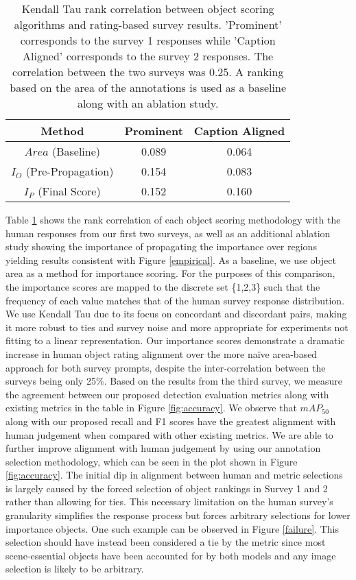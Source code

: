 \documentclass[10pt,twocolumn,letterpaper]{article}
\begin{document}
\begin{table}[t!]
\footnotesize
\centering %
\begin{tabular}{c|c|c} %
\hline
Method & Prominent & Caption Aligned\\
\hline
$Area$ (Baseline) & 0.089 & 0.064 \\
$I_{O}$ (Pre-Propagation) & 0.154 & 0.083\\
$I_{P}$ (Final Score) & 0.152 & 0.160\\
\hline
\end{tabular}
\vspace{1px}
\caption{Kendall Tau rank correlation between object scoring algorithms and rating-based survey results. 'Prominent' corresponds to the survey 1 responses while 'Caption Aligned' corresponds to the survey 2 responses. The correlation between the two surveys was 0.25. A ranking based on the area of the annotations is used as a baseline along with an ablation study.} %
\label{table:weight_correlation} %
\end{table}
\par
Table \ref{table:weight_correlation} shows the rank correlation of each object scoring methodology with the human responses from our first two surveys, as well as an additional ablation study showing the importance of propagating the importance over regions yielding results consistent with Figure \ref{empirical}. As a baseline, we use object area as a method for importance scoring. For the purposes of this comparison, the importance scores are mapped to the discrete set \{1,2,3\} such that the frequency of each value matches that of the human survey response distribution. We use Kendall Tau due to its focus on concordant and discordant pairs, making it more robust to ties and survey noise and more appropriate for experiments not fitting to a linear representation. Our importance scores demonstrate a dramatic increase in human object rating alignment over the more na\"ive area-based approach for both survey prompts, despite the inter-correlation between the surveys being only 25\%. Based on the results from the third survey, we measure the agreement between our proposed detection evaluation metrics along with existing metrics in the table in Figure \ref{fig:accuracy}. We observe that $mAP_{50}$ along with our proposed recall and F1 scores have the greatest alignment with human judgement when compared with other existing metrics. We are able to further improve alignment with human judgement by using our annotation selection methodology, which can be seen in the plot shown in Figure \ref{fig:accuracy}. The initial dip in alignment between human and metric selections is largely caused by the forced selection of object rankings in Survey 1 and 2 rather than allowing for ties. This necessary limitation on the human survey's granularity simplifies the response process but forces arbitrary selections for lower importance objects. One such example can be observed in Figure \ref{failure}. This selection should have instead been considered a tie by the metric since most scene-essential objects have been accounted for by both models and any image selection is likely to be arbitrary.
\end{document}
